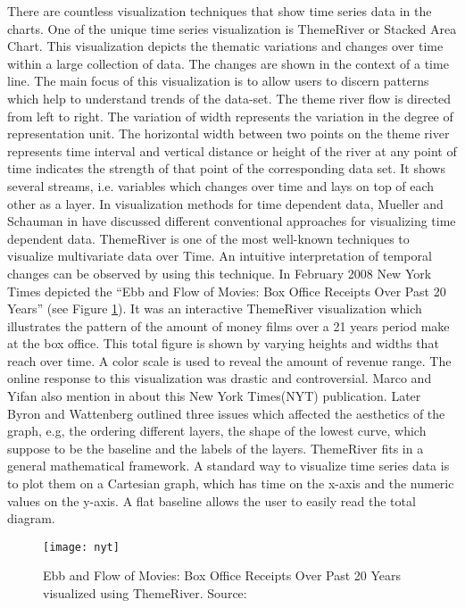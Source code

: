 There are countless visualization techniques that show time series data in the charts. One of the unique time series visualization is ThemeRiver \cite{981848} or Stacked Area Chart. This visualization depicts the thematic variations and changes over time within a large collection of data. The changes are shown in the context of a time line. The main focus of this visualization is to allow users to discern patterns which help to understand trends of the data-set. The theme river flow is directed from left to right. The variation of width represents the variation in the degree of representation unit. The horizontal width between two points on the theme river represents time interval and vertical distance or height of the river at any point of time indicates the strength of that point of the corresponding data set. It shows several streams, i.e. variables which changes over time and lays on top of each other as a layer. In visualization methods for time dependent data, Mueller and Schauman in \cite{1261490} have discussed different conventional approaches for visualizing time dependent data. ThemeRiver is one of the most well-known techniques to visualize multivariate data over Time. An intuitive interpretation of temporal changes can be observed by using this technique. In February 2008 New York Times depicted the “Ebb and Flow of Movies: Box Office Receipts Over Past 20 Years” \cite{boxoffice} (see Figure \ref{fig:nyk}). It was an interactive ThemeRiver visualization which illustrates the pattern of the amount of money films over a 21 years period make at the box office. This total figure is shown by varying heights and widths that reach over time. A color scale is used to reveal the amount of revenue range. The online response to this visualization was drastic and controversial. Marco and Yifan also mention in \cite{CGF12910} about this New York Times(NYT) publication. Later Byron and Wattenberg \cite{Byron2008} outlined three issues which affected the aesthetics of the graph, e.g, the ordering different layers, the shape of the lowest curve, which suppose to be the baseline and the labels of the layers. ThemeRiver fits in a general mathematical framework. A standard way to visualize time series data is to plot them on a Cartesian graph, which has time on the x-axis and the numeric values on the y-axis. A flat baseline allows the user to easily read the total diagram. 

\begin{figure}
  \begin{center}
    \texttt{[image: nyt]}
    \caption{Ebb and Flow of Movies: Box Office Receipts Over Past 20 Years visualized using ThemeRiver. Source:\cite{boxoffice}}
    \label{fig:nyk}
  \end{center}
\end{figure}

